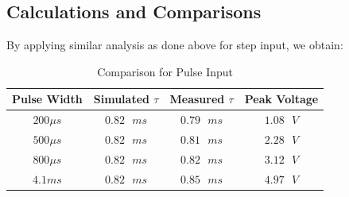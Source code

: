 \documentclass[12pt, a4paper]{article}
\begin{document}
\subsection{Calculations and Comparisons}
By applying similar analysis as done above for step input, we obtain:
\begin{table}[H]
    \centering
    \begin{tabular}{cccc}
        \toprule
        Pulse Width & Simulated $\tau$ & Measured $\tau$ & Peak Voltage \\
        \midrule
        $200\mu s$ & $0.82\text{ } ms$ & $0.79 \text{ }ms$ & $1.08\text{ }V$ \\
        $500\mu s$ & $0.82\text{ } ms$ & $0.81 \text{ }ms$ & $2.28\text{ }V$ \\
        $800\mu s$ & $0.82\text{ } ms$ & $0.82 \text{ }ms$ & $3.12\text{ }V$ \\
        $4.1 ms$ & $0.82\text{ } ms$ & $0.85 \text{ }ms$ & $4.97\text{ }V$ \\
        \bottomrule
    \end{tabular}
    \caption{Comparison for Pulse Input}
\end{table}
\end{document}
